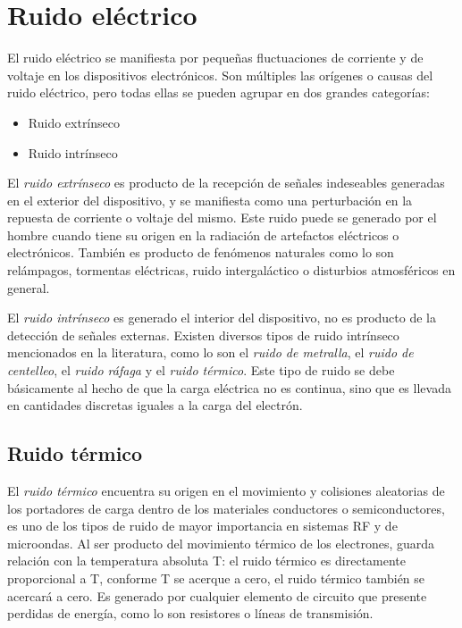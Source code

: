 \documentclass{article}
\title{}
\author{}
\date{2017-03-28}
\begin{document}
	
	\section{Ruido eléctrico}
		El ruido eléctrico se manifiesta por pequeñas fluctuaciones de corriente y de voltaje en los dispositivos electrónicos. Son múltiples las orígenes o causas del ruido eléctrico, pero todas ellas se pueden agrupar en dos grandes categorías:
		
		\begin{itemize} 
			\item Ruido extrínseco
			\item Ruido intrínseco
		\end{itemize}	
	
		El \emph{ruido extrínseco} es producto de la recepción de señales indeseables generadas en el exterior del dispositivo, y se manifiesta como una perturbación en la repuesta de corriente o voltaje del mismo. Este ruido puede se generado por el hombre cuando tiene su origen en la radiación de artefactos eléctricos o electrónicos. También es producto de fenómenos naturales como lo son relámpagos, tormentas eléctricas, ruido intergaláctico o disturbios atmosféricos en general.
		
		El \emph{ruido intrínseco} es generado el interior del dispositivo, no es producto de la detección de señales externas. Existen diversos tipos de ruido intrínseco mencionados en la literatura, como lo son el \emph{ruido de metralla}, el \emph{ruido de centelleo}, el \emph{ruido ráfaga} y el \emph{ruido térmico}. Este tipo de ruido se debe básicamente al hecho de que la carga eléctrica no es continua, sino que es llevada en cantidades discretas iguales a la carga del electrón.
			
		\subsection{Ruido térmico}
		
		El \emph{ruido térmico} encuentra su origen en el movimiento y colisiones aleatorias de los portadores de carga dentro de los materiales conductores o semiconductores, es uno de los tipos de ruido de mayor importancia en sistemas RF y de microondas. Al ser producto del movimiento térmico de los electrones, guarda relación con la temperatura absoluta T: el ruido térmico es directamente proporcional a T, conforme T se acerque a cero, el ruido térmico también se acercará a cero. Es generado por cualquier elemento de circuito que presente perdidas de energía, como lo son resistores o líneas de transmisión. 
		
\end{document}
